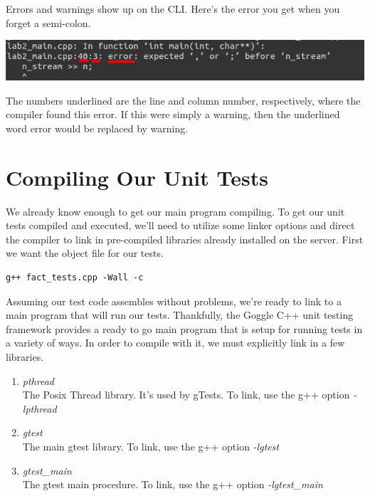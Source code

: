 \documentclass[]{tufte-handout}
\begin{document}
Errors and warnings show up on the CLI. Here's the error you get when you forget a semi-colon.
\vspace{.1in}
\begin{center}
\includegraphics[scale=.5]{compiler-error.png}
\end{center}
\vspace{.1in}
The numbers underlined are the line and column number, respectively, where the compiler found this error. If this were simply a warning, then the underlined word error would be replaced by warning.  


\section{Compiling Our Unit Tests}

We already know enough to get our main program compiling. To get our unit tests compiled and executed, we'll need to utilize some linker options and direct the compiler to link in pre-compiled libraries already installed on the server. First we want the object file for our tests.
\begin{verbatim}
g++ fact_tests.cpp -Wall -c
\end{verbatim}

Assuming our test code assembles without problems, we're ready to link to a main program that will run our tests.  Thankfully, the Goggle C++ unit testing framework provides a ready to go main program that is setup for running tests in a variety of ways. In order to compile with it, we must explicitly link in a few libraries. 
\begin{enumerate}
\item \textit{pthread} \\ The Posix Thread library. It's used by gTests. To link, use the g++ option \textit{-lpthread}
\item \textit{gtest} \\ The main gtest library. To link, use the g++ option \textit{-lgtest}
\item \textit{gtest\_main} \\ The gtest main procedure. To link, use the g++ option \textit{-lgtest\_main}
\end{enumerate}
\end{document}
